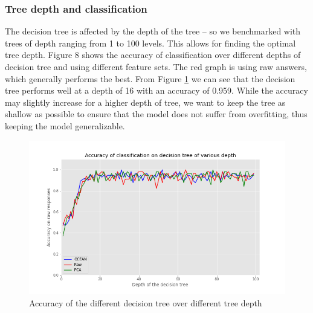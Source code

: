 \documentclass[conference]{IEEEtran}
\begin{document}


\subsubsection{Tree depth and classification}\label{subsubsec2}
The decision tree is affected by the depth of the tree – so we benchmarked with
trees of depth ranging from 1 to 100 levels. This allows for finding the optimal tree
depth. Figure 8 shows the accuracy of classification over different depths of decision
tree and using different feature sets. The red graph is using raw answers, which
generally performs the best.
From Figure  \ref{fig:USUall3} we can see that the decision tree performs well at a depth of 16 with an
accuracy of 0.959. While the accuracy may slightly increase for a higher depth of tree,
we want to keep the tree as shallow as possible to ensure that the model does not suffer
from overfitting, thus keeping the model generalizable.

\begin{figure}[h]
\includegraphics[scale=0.4]{figs/USUall3.png}
\caption{Accuracy of the different decision tree over different tree depth}
\label{fig:USUall3}
\centering
\end{figure}
\end{document}
